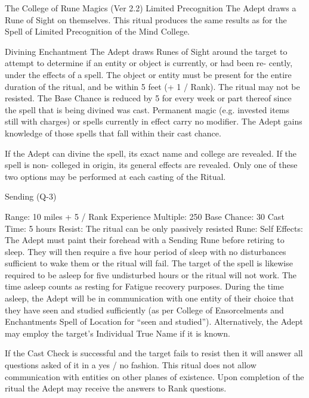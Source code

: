 \begin{Chapter}{The College of Rune Magics (Ver 2.2)}
Limited Precognition The Adept draws a Rune of 
Sight on themselves. This ritual produces the same 
results  as  for  the  Spell  of  Limited  Precognition  of 
the Mind College. 

Divining Enchantment The Adept draws Runes of 
Sight  around  the  target  to  attempt  to  determine  if 
an  entity  or  object  is  currently,  or  had  been  re-
cently,  under  the  effects  of  a  spell.  The  object  or 
entity must be present for the entire duration of the 
ritual, and be within 5 feet (+ 1 / Rank). The ritual 
may  not  be  resisted.  The  Base  Chance  is  reduced 
by 5 for every  week or part thereof since the spell 
that  is  being  divined  was  cast.  Permanent  magic 
(e.g.  invested  items  still  with  charges)  or  spells 
currently  in  effect  carry  no  modifier.  The  Adept 
gains  knowledge  of  those  spells  that  fall  within 
their cast chance. 

If  the  Adept  can  divine  the  spell,  its  exact  name 
and  college  are  revealed.  If  the  spell  is  non-
colleged  in  origin,  its  general  effects  are  revealed. 
Only one of these two options may be performed at 
each casting of the Ritual. 

Sending (Q-3) 

Range: 10 miles + 5 / Rank 
Experience Multiple: 250 
Base Chance: 30%
Cast Time: 5 hours 
Resist: The ritual can be only passively resisted 
Rune: Self 
Effects: The Adept must paint their forehead with a 
Sending  Rune  before  retiring  to  sleep.  They  will 
then  require  a  five  hour  period  of  sleep  with  no 
disturbances  sufficient  to  wake  them  or  the  ritual 
will fail. The target of the spell is likewise required 
to be asleep for five undisturbed hours or the ritual 
will not work. The time asleep counts as resting for 
Fatigue recovery purposes. During the time asleep, 
the Adept will be in communication with one entity 
of  their  choice  that  they  have  seen  and  studied 
sufficiently  (as  per  College  of  Ensorcelments  and 
Enchantments  Spell  of  Location  for  “seen  and 
studied”). Alternatively, the Adept may employ the 
target’s Individual True Name if it is known. 

If the Cast Check is successful and the target fails 
to resist then it will answer all questions asked of it 
in  a  yes  /  no  fashion.  This  ritual  does  not  allow 
communication  with  entities  on  other  planes  of 
existence. Upon completion of the ritual the Adept 
may receive the answers to Rank questions. 


\end{Chapter}
